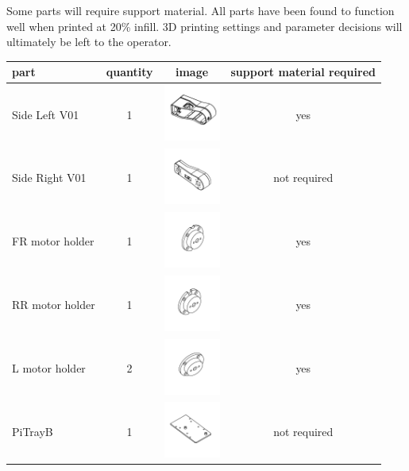 \documentclass[12pt,titlepage,oneside]{memoir}
\begin{document}
Some parts will require support material. All parts have been found to function well when printed at 20\% infill. 3D printing settings and parameter decisions will ultimately be left to the operator. 

\begin{table}
\begin{tabular}{p{5cm} | c | c | c}
part & quantity & image & support material required\\
\hline
Side Left V01 & 1 & \includegraphics[width=70px]{diagram/Side_Left_V01.pdf} & yes\\
Side Right V01 & 1 & \includegraphics[width=70px]{diagram/Side_Right_V01.pdf} & not required\\
FR motor holder & 1 & \includegraphics[width=70px]{diagram/FR_motor_holder.pdf} & yes\\
RR motor holder & 1 & \includegraphics[width=70px]{diagram/RR_motor_holder.pdf} & yes\\
L motor holder & 2 & \includegraphics[width=70px]{diagram/L_motor_holder.pdf} & yes\\
PiTrayB & 1 & \includegraphics[width=70px]{diagram/PiTrayB.pdf} & not required\\

\end{tabular}
\end{table}
\end{document}
